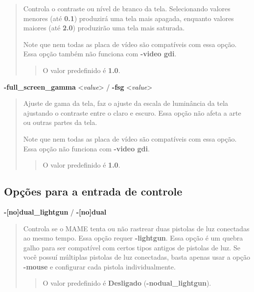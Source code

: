 \documentclass[letterpaper,10pt,brazil]{sphinxmanual}
\begin{document}
\begin{quote}

Controla o contraste ou nível de branco da tela.
Selecionando valores menores (até \textbf{0.1}) produzirá uma tela mais
apagada, enquanto valores maiores (até \textbf{2.0}) produzirão uma tela
mais saturada.

Note que nem todas as placa de vídeo são compatíveis com essa opção.
Essa opção também não funciona com \textbf{-video gdi}.
\begin{quote}

O valor predefinido é \textbf{1.0}.
\end{quote}
\end{quote}
\label{commandline/windowsconfig:mame-wcommandline-fullscreengamma}
\textbf{-full\_screen\_gamma} \textless{}\emph{value}\textgreater{} / \textbf{-fsg} \textless{}\emph{value}\textgreater{}
\begin{quote}

Ajuste de gama da tela, faz o ajuste da escala de luminância da
tela ajustando o contraste entre o claro e escuro.
Essa opção não afeta a arte ou outras partes da tela.

Note que nem todas as placa de vídeo são compatíveis com essa opção.
Essa opção não funciona com \textbf{-video gdi}.
\begin{quote}

O valor predefinido é \textbf{1.0}.
\end{quote}
\end{quote}


\subsection{Opções para a entrada de controle}
\label{commandline/windowsconfig:opcoes-para-a-entrada-de-controle}\label{commandline/windowsconfig:mame-wcommandline-duallightgun}
\textbf{-{[}no{]}dual\_lightgun} / \textbf{-{[}no{]}dual}
\begin{quote}

Controla se o MAME tenta ou não rastrear duas pistolas de luz
conectadas ao mesmo tempo. Essa opção requer \textbf{-lightgun}. Essa
opção é um quebra galho para ser compatível com certos tipos antigos
de pistolas de luz. Se você possuí múltiplas pistolas de luz
conectadas, basta apenas usar a opção \textbf{-mouse} e configurar cada
pistola individualmente.
\begin{quote}

O valor predefinido é \textbf{Desligado} (\textbf{-nodual\_lightgun}).
\end{quote}
\end{quote}
\end{document}

